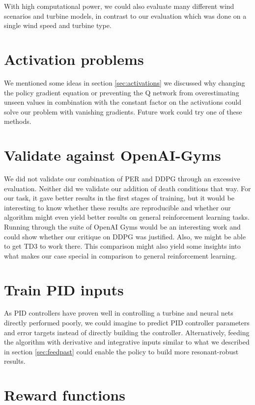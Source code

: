 \documentclass[hyperref,final,beleg]{cgvpub}
\begin{document}
With high computational power, we could also evaluate many different wind scenarios and turbine models, in contrast to our evaluation which was done on a single wind speed and turbine type.

\section{Activation problems}

We mentioned some ideas in section \ref{sec:activations} we discussed why changing the policy gradient equation or preventing the Q network from overestimating unseen values in combination with the constant factor on the activations could solve our problem with vanishing gradients. Future work could try one of these methods.

\section{Validate against OpenAI-Gyms}

We did not validate our combination of \ac{PER} and \ac{DDPG} through an excessive evaluation. Neither did we validate our addition of death conditions that way. For our task, it gave better results in the first stages of training, but it would be interesting to know whether these results are reproducible and whether our algorithm might even yield better results on general reinforcement learning tasks. Running through the suite of OpenAI Gyms would be an interesting work and could show whether our critique on \ac{DDPG} was justified. Also, we might be able to get \ac{TD3} to work there. This comparison might also yield some insights into what makes our case special in comparison to general reinforcement learning.

\section{Train PID inputs}

As PID controllers have proven well in controlling a turbine and neural nets directly performed poorly, we could imagine to predict PID controller parameters and error targets instead of directly building the controller. Alternatively, feeding the algorithm with derivative and integrative inputs similar to what we described in section \ref{sec:feedpast} could enable the policy to build more resonant-robust results.

\section{Reward functions}
\end{document}
